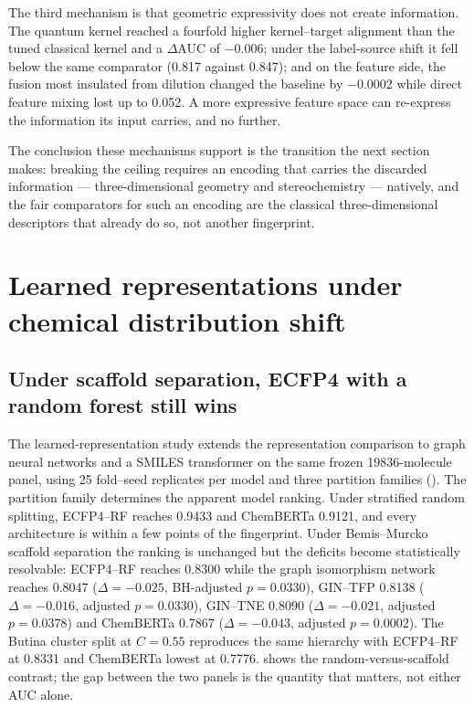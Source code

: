 The third mechanism is that geometric expressivity does not create information. The quantum kernel reached a fourfold higher kernel--target alignment than the tuned classical kernel and a $\Delta$AUC of \num{-0.006}; under the label-source shift it fell below the same comparator (\num{0.817} against \num{0.847}); and on the feature side, the fusion most insulated from dilution changed the baseline by \num{-0.0002} while direct feature mixing lost up to \num{0.052}. A more expressive feature space can re-express the information its input carries, and no further.

The conclusion these mechanisms support is the transition the next section makes: breaking the ceiling requires an encoding that carries the discarded information --- three-dimensional geometry and stereochemistry --- natively, and the fair comparators for such an encoding are the classical three-dimensional descriptors that already do so, not another fingerprint.

\section{Learned representations under chemical distribution shift}\label{sec:res_learned}

\subsection{Under scaffold separation, ECFP4 with a random forest still wins}

The learned-representation study extends the representation comparison to graph neural networks and a SMILES transformer on the same frozen \num{19836}-molecule panel, using \num{25} fold--seed replicates per model and three partition families (). The partition family determines the apparent model ranking. Under stratified random splitting, ECFP4--RF reaches \num{0.9433} and ChemBERTa \num{0.9121}, and every architecture is within a few points of the fingerprint. Under Bemis--Murcko scaffold separation the ranking is unchanged but the deficits become statistically resolvable: ECFP4--RF reaches \num{0.8300} while the graph isomorphism network reaches \num{0.8047} ($\Delta = \num{-0.025}$, BH-adjusted $p = \num{0.0330}$), GIN--TFP \num{0.8138} ($\Delta = \num{-0.016}$, adjusted $p = \num{0.0330}$), GIN--TNE \num{0.8090} ($\Delta = \num{-0.021}$, adjusted $p = \num{0.0378}$) and ChemBERTa \num{0.7867} ($\Delta = \num{-0.043}$, adjusted $p = \num{0.0002}$). The Butina cluster split at $C = \num{0.55}$ reproduces the same hierarchy with ECFP4--RF at \num{0.8331} and ChemBERTa lowest at \num{0.7776}.  shows the random-versus-scaffold contrast; the gap between the two panels is the quantity that matters, not either AUC alone.


